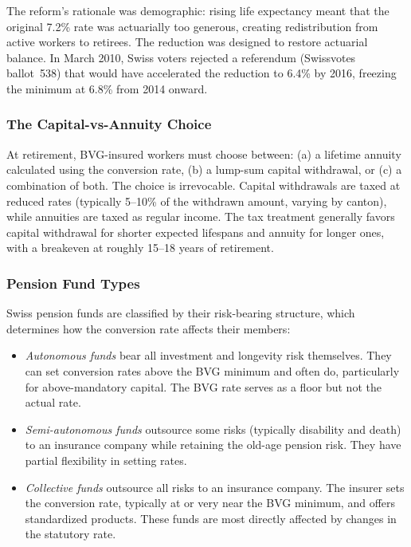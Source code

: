 \documentclass[12pt]{article}
\begin{document}
The reform's rationale was demographic: rising life expectancy meant that the original 7.2\% rate was actuarially too generous, creating redistribution from active workers to retirees. The reduction was designed to restore actuarial balance. In March 2010, Swiss voters rejected a referendum (Swissvotes ballot~538) that would have accelerated the reduction to 6.4\% by 2016, freezing the minimum at 6.8\% from 2014 onward.

\subsubsection*{The Capital-vs-Annuity Choice} At retirement, BVG-insured workers must choose between: (a) a lifetime annuity calculated using the conversion rate, (b) a lump-sum capital withdrawal, or (c) a combination of both. The choice is irrevocable. Capital withdrawals are taxed at reduced rates (typically 5--10\% of the withdrawn amount, varying by canton), while annuities are taxed as regular income. The tax treatment generally favors capital withdrawal for shorter expected lifespans and annuity for longer ones, with a breakeven at roughly 15--18 years of retirement.

\subsubsection*{Pension Fund Types} Swiss pension funds are classified by their risk-bearing structure, which determines how the conversion rate affects their members:

\begin{itemize}
\item \textit{Autonomous funds} bear all investment and longevity risk themselves. They can set conversion rates above the BVG minimum and often do, particularly for above-mandatory capital. The BVG rate serves as a floor but not the actual rate.
\item \textit{Semi-autonomous funds} outsource some risks (typically disability and death) to an insurance company while retaining the old-age pension risk. They have partial flexibility in setting rates.
\item \textit{Collective funds} outsource all risks to an insurance company. The insurer sets the conversion rate, typically at or very near the BVG minimum, and offers standardized products. These funds are most directly affected by changes in the statutory rate.
\end{itemize}
\end{document}
